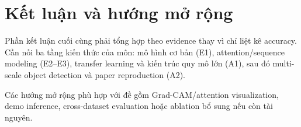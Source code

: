 \section{Kết luận và hướng mở rộng}

Phần kết luận cuối cùng phải tổng hợp theo evidence thay vì chỉ liệt kê accuracy. Cần nối ba tầng kiến thức của môn: mô hình cơ bản (E1), attention/sequence modeling (E2--E3), transfer learning và kiến trúc quy mô lớn (A1), sau đó multi-scale object detection và paper reproduction (A2).


Các hướng mở rộng phù hợp với đề gồm Grad-CAM/attention visualization, demo inference, cross-dataset evaluation hoặc ablation bổ sung nếu còn tài nguyên.
